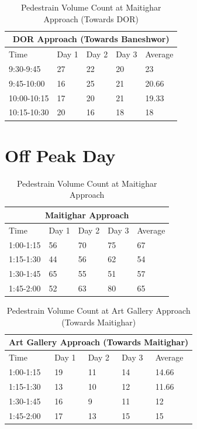 \clearpage

\begin{table}[t]
    \centering
    \caption{ Pedestrain Volume Count at Maitighar Approach (Towards DOR)}
    \begin{tabular}{|l|l|l|l|l|}
        \hline
        \multicolumn{5}{|c|}{ \textbf{DOR Approach (Towards Baneshwor) } } \\
        \hline
        Time	&Day 1	&Day 2	&Day 3	&Average \\ \hline
        9:30-9:45	&27	&22	&20	&23 \\ \hline
        9:45-10:00	&16	&25	&21	&20.66 \\ \hline
        10:00-10:15	&17	&20	&21	&19.33 \\ \hline
        10:15-10:30	&20	&16	&18	&18 \\ \hline
    \end{tabular}
\end{table}


\clearpage
\section{Off Peak Day}
\begin{table}[h!]
    \centering
    \caption{ Pedestrain Volume Count at Maitighar Approach} 
    \begin{tabular}{|l|l|l|l|l|}
        \hline
        \multicolumn{5}{|c|}{ \textbf{Maitighar Approach } } \\
        \hline
        Time	&Day 1	&Day 2	&Day 3	&Average \\ \hline
        1:00-1:15	&56	&70	&75	&67 \\ \hline
        1:15-1:30	&44	&56	&62	&54 \\ \hline
        1:30-1:45	&65	&55	&51	&57 \\ \hline
        1:45-2:00	&52	&63	&80	&65 \\ \hline
    \end{tabular}
\end{table}

\begin{table}[h!]
    \centering
    \caption{Pedestrain Volume Count at Art Gallery Approach (Towards Maitighar)}
    \begin{tabular}{|l|l|l|l|l|}
        \hline
        \multicolumn{5}{|c|}{ \textbf{Art Gallery Approach (Towards Maitighar) } } \\
        \hline
        Time	&Day 1	&Day 2	&Day 3	&Average \\ \hline
        1:00-1:15	&19	&11	&14	&14.66 \\ \hline
        1:15-1:30	&13	&10	&12	&11.66 \\ \hline
        1:30-1:45	&16	&9	&11	&12 \\ \hline
        1:45-2:00	&17	&13	&15	&15 \\ \hline
    \end{tabular}
\end{table}

